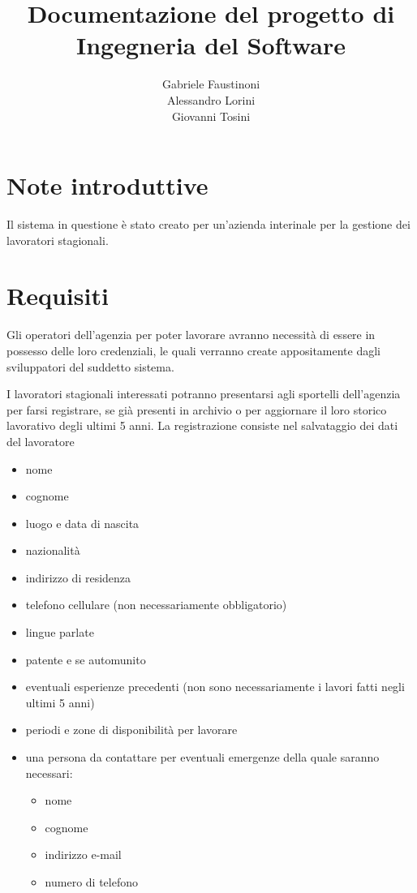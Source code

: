 \underline{}\documentclass{article}
\title{Documentazione del progetto di \\ Ingegneria del Software}
\author{Gabriele Faustinoni \\ Alessandro Lorini \\ Giovanni Tosini}
\date{}
\begin{document}
    \begin{titlepage}
        \maketitle
    \end{titlepage}

    \newpage
    \tableofcontents
    \newpage

    \section{Note introduttive}

    Il sistema in questione è stato creato per un'azienda interinale 
    per la gestione dei lavoratori stagionali.

    \section{Requisiti}

    Gli operatori dell'agenzia per poter lavorare avranno necessità di essere in possesso delle loro credenziali, le quali verranno create appositamente dagli sviluppatori del suddetto sistema.

    I lavoratori stagionali interessati potranno presentarsi agli sportelli dell'agenzia per farsi registrare, se già presenti in archivio o per aggiornare il loro storico lavorativo degli ultimi 5 anni.
    La registrazione consiste nel salvataggio dei dati del lavoratore

    \begin{itemize}
        \item nome
        \item cognome
        \item luogo e data di nascita
        \item nazionalità
        \item indirizzo di residenza
        \item telefono cellulare (non necessariamente obbligatorio)
        \item lingue parlate
        \item patente e se automunito
        \item eventuali esperienze precedenti (non sono necessariamente i lavori fatti negli ultimi 5 anni)
        \item periodi e zone di disponibilità per lavorare
        \item una persona da contattare per eventuali emergenze della quale saranno necessari: 
        \begin{itemize}
            \item nome
            \item cognome
            \item indirizzo e-mail
            \item numero di telefono
        \end{itemize}
    \end{itemize}
\end{document}
